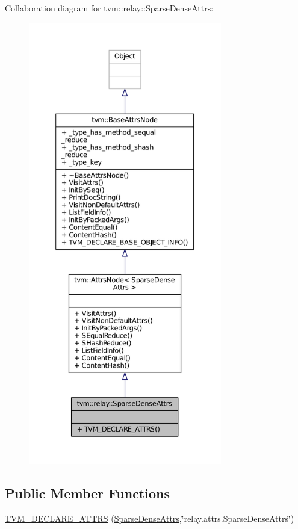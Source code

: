 Collaboration diagram for tvm\+:\+:relay\+:\+:Sparse\+Dense\+Attrs\+:
\nopagebreak
\begin{figure}[H]
\begin{center}
\leavevmode
\includegraphics[height=550pt]{structtvm_1_1relay_1_1SparseDenseAttrs__coll__graph}
\end{center}
\end{figure}
\subsection*{Public Member Functions}
\begin{DoxyCompactItemize}
\item 
\hyperlink{structtvm_1_1relay_1_1SparseDenseAttrs_aed4fc8e3408e5a7e81eca45fd53fbfd2}{T\+V\+M\+\_\+\+D\+E\+C\+L\+A\+R\+E\+\_\+\+A\+T\+T\+RS} (\hyperlink{structtvm_1_1relay_1_1SparseDenseAttrs}{Sparse\+Dense\+Attrs},\char`\"{}relay.\+attrs.\+Sparse\+Dense\+Attrs\char`\"{})
\end{DoxyCompactItemize}
